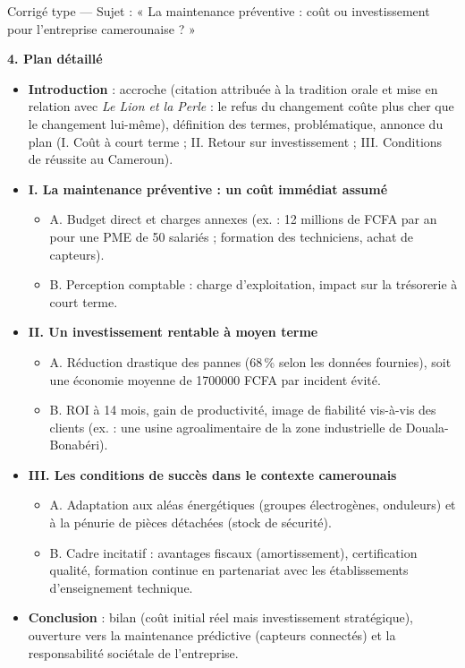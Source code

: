 \documentclass[11pt]{article}
\begin{document}
\begin{exoresolu}{Corrigé type — Sujet : « La maintenance préventive : coût ou investissement pour l'entreprise camerounaise ? »}
\begin{center}
\end{center}
\textbf{4. Plan détaillé}
\begin{itemize}
    \item \textbf{Introduction} : accroche (citation attribuée à la tradition orale et mise en relation avec \emph{Le Lion et la Perle} : le refus du changement coûte plus cher que le changement lui-même), définition des termes, problématique, annonce du plan (I. Coût à court terme ; II. Retour sur investissement ; III. Conditions de réussite au Cameroun).
    \item \textbf{I. La maintenance préventive : un coût immédiat assumé}
        \begin{itemize}
            \item A. Budget direct et charges annexes (ex. : 12 millions de FCFA par an pour une PME de 50 salariés ; formation des techniciens, achat de capteurs).
            \item B. Perception comptable : charge d'exploitation, impact sur la trésorerie à court terme.
        \end{itemize}
    \item \textbf{II. Un investissement rentable à moyen terme}
        \begin{itemize}
            \item A. Réduction drastique des pannes (68\,\% selon les données fournies), soit une économie moyenne de \num{1700000} FCFA par incident évité.
            \item B. ROI à 14 mois, gain de productivité, image de fiabilité vis-à-vis des clients (ex. : une usine agroalimentaire de la zone industrielle de Douala-Bonabéri).
        \end{itemize}
    \item \textbf{III. Les conditions de succès dans le contexte camerounais}
        \begin{itemize}
            \item A. Adaptation aux aléas énergétiques (groupes électrogènes, onduleurs) et à la pénurie de pièces détachées (stock de sécurité).
            \item B. Cadre incitatif : avantages fiscaux (amortissement), certification qualité, formation continue en partenariat avec les établissements d'enseignement technique.
        \end{itemize}
    \item \textbf{Conclusion} : bilan (coût initial réel mais investissement stratégique), ouverture vers la maintenance prédictive (capteurs connectés) et la responsabilité sociétale de l'entreprise.

\end{itemize}
\end{exoresolu}
\end{document}
